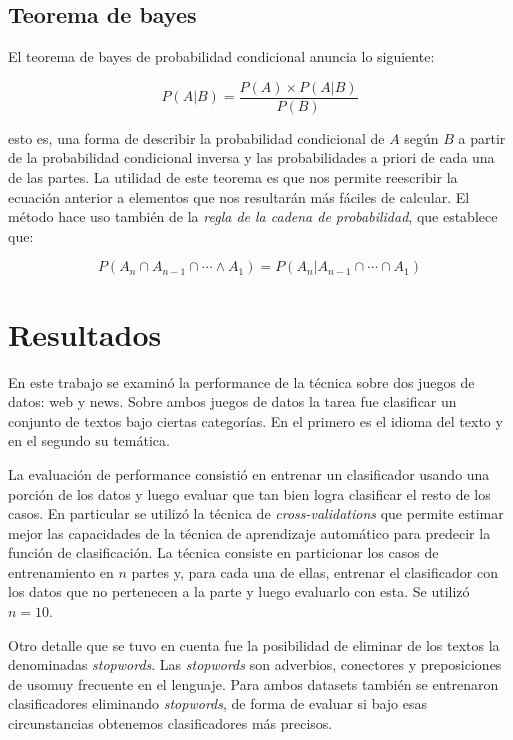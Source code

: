 \documentclass[a4paper,10pt]{article}
\begin{document}
\subsection{Teorema de bayes}

El teorema de bayes de probabilidad condicional anuncia lo siguiente:

$$ P(A | B) = \frac{P(A) \times P(A | B)}{P(B)} $$

esto es, una forma de describir la probabilidad condicional de $A$ según $B$ a partir de la probabilidad condicional inversa y las probabilidades a priori de cada una de las partes. La utilidad de este teorema es que nos permite reescribir la ecuación anterior a elementos que nos resultarán más fáciles de calcular. El método hace uso también de la \emph{regla de la cadena de probabilidad}, que establece que:

$$ P(A_n \cap A_{n-1} \cap \cdots \land A_1) = P(A_n | A_{n-1} \cap \cdots \cap A_1) $$

\section{Resultados}

En este trabajo se examinó la performance de la técnica sobre dos juegos de datos: \textsf{web} y \textsf{news}. Sobre ambos juegos de datos la tarea fue clasificar un conjunto de textos bajo ciertas categorías. En el primero es el idioma del texto y en el segundo su temática. 

La evaluación de performance consistió en entrenar un clasificador usando una porción de los datos y luego evaluar que tan bien logra clasificar el resto de los casos. En particular se utilizó la técnica de \emph{cross-validations} que permite estimar mejor las capacidades de la técnica de aprendizaje automático para predecir la función de clasificación. La técnica consiste en particionar los casos de entrenamiento en $n$ partes y, para cada una de ellas, entrenar el clasificador con los datos que no pertenecen a la parte y luego evaluarlo con esta. Se utilizó $n = 10$.

Otro detalle que se tuvo en cuenta fue la posibilidad de eliminar de los textos la denominadas \emph{stopwords}. Las \emph{stopwords} son adverbios, conectores y preposiciones de usomuy frecuente en el lenguaje. Para ambos datasets también se entrenaron clasificadores eliminando \emph{stopwords}, de forma de evaluar si bajo esas circunstancias obtenemos clasificadores más precisos.
\end{document}
